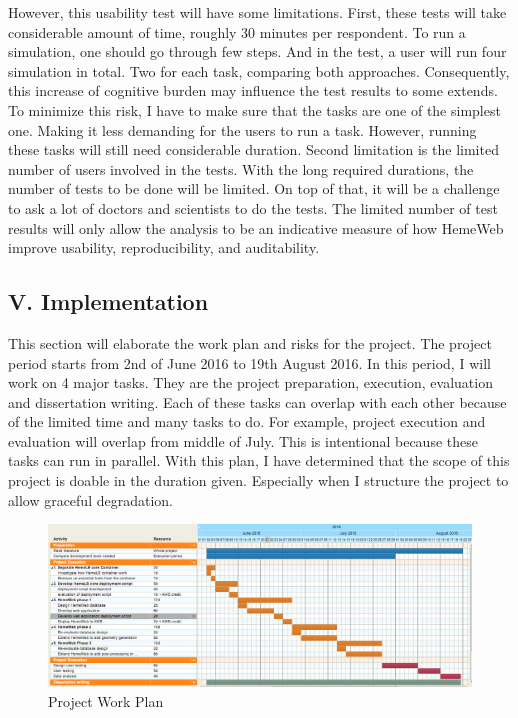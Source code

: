 \documentclass[]{article}
\begin{document}
However, this usability test will have some limitations. First, these
tests will take considerable amount of time, roughly 30 minutes per
respondent. To run a simulation, one should go through few steps. And in
the test, a user will run four simulation in total. Two for each task,
comparing both approaches. Consequently, this increase of cognitive
burden may influence the test results to some extends. To minimize this
risk, I have to make sure that the tasks are one of the simplest one.
Making it less demanding for the users to run a task. However, running
these tasks will still need considerable duration. Second limitation is
the limited number of users involved in the tests. With the long
required durations, the number of tests to be done will be limited. On
top of that, it will be a challenge to ask a lot of doctors and
scientists to do the tests. The limited number of test results will only
allow the analysis to be an indicative measure of how HemeWeb improve
usability, reproducibility, and auditability.

\subsection{V. Implementation}\label{v.-implementation}

This section will elaborate the work plan and risks for the project. The
project period starts from 2nd of June 2016 to 19th August 2016. In this
period, I will work on 4 major tasks. They are the project preparation,
execution, evaluation and dissertation writing. Each of these tasks can
overlap with each other because of the limited time and many tasks to
do. For example, project execution and evaluation will overlap from
middle of July. This is intentional because these tasks can run in
parallel. With this plan, I have determined that the scope of this
project is doable in the duration given. Especially when I structure the
project to allow graceful degradation.

\begin{figure}[H]
\centering
\includegraphics{../resources/images/workplan.png}
\caption{Project Work Plan}
\end{figure}
\end{document}
